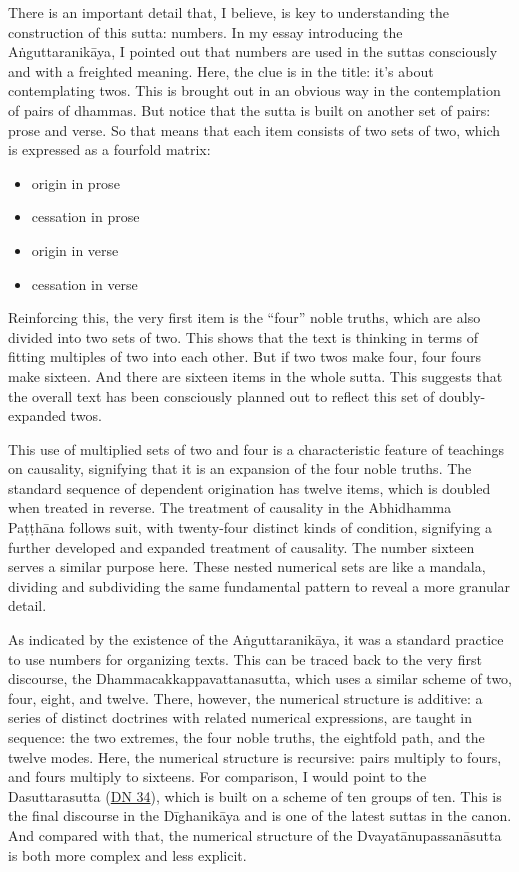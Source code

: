 \documentclass[12pt,openany]{book}%
\begin{document}
There is an important detail that, I believe, is key to understanding the construction of this sutta: numbers. In my essay introducing the \textsanskrit{Aṅguttaranikāya}, I pointed out that numbers are used in the suttas consciously and with a freighted meaning. Here, the clue is in the title: it’s about contemplating twos. This is brought out in an obvious way in the contemplation of pairs of dhammas. But notice that the sutta is built on another set of pairs: prose and verse. So that means that each item consists of two sets of two, which is expressed as a fourfold matrix:

\begin{itemize}%
\item origin in prose%
\item cessation in prose%
\item origin in verse%
\item cessation in verse%
\end{itemize}

Reinforcing this, the very first item is the “four” noble truths, which are also divided into two sets of two. This shows that the text is thinking in terms of fitting multiples of two into each other. But if two twos make four, four fours make sixteen. And there are sixteen items in the whole sutta. This suggests that the overall text has been consciously planned out to reflect this set of doubly-expanded twos.

This use of multiplied sets of two and four is a characteristic feature of teachings on causality, signifying that it is an expansion of the four noble truths. The standard sequence of dependent origination has twelve items, which is doubled when treated in reverse. The treatment of causality in the Abhidhamma \textsanskrit{Paṭṭhāna} follows suit, with twenty-four distinct kinds of condition, signifying a further developed and expanded treatment of causality. The number sixteen serves a similar purpose here. These nested numerical sets are like a mandala, dividing and subdividing the same fundamental pattern to reveal a more granular detail.

As indicated by the existence of the \textsanskrit{Aṅguttaranikāya}, it was a standard practice to use numbers for organizing texts. This can be traced back to the very first discourse, the Dhammacakkappavattanasutta, which uses a similar scheme of two, four, eight, and twelve. There, however, the numerical structure is additive: a series of distinct doctrines with related numerical expressions, are taught in sequence: the two extremes, the four noble truths, the eightfold path, and the twelve modes. Here, the numerical structure is recursive: pairs multiply to fours, and fours multiply to sixteens. For comparison, I would point to the Dasuttarasutta (\href{https://suttacentral.net/dn34/en/sujato}{DN 34}), which is built on a scheme of ten groups of ten. This is the final discourse in the \textsanskrit{Dīghanikāya} and is one of the latest suttas in the canon. And compared with that, the numerical structure of the \textsanskrit{Dvayatānupassanāsutta} is both more complex and less explicit.
\end{document}
